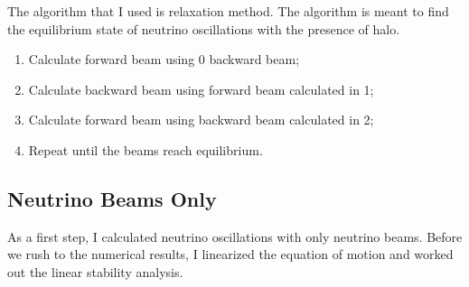 The algorithm that I used is relaxation method. The algorithm is meant to find the equilibrium state of neutrino oscillations with the presence of halo.
\begin{enumerate}
\item Calculate forward beam using 0 backward beam;
\item Calculate backward beam using forward beam calculated in 1;
\item Calculate forward beam using backward beam calculated in 2;
\item Repeat until the beams reach equilibrium.
\end{enumerate}


\subsection{\label{chap:halo-sec:line-sym}Neutrino Beams Only}

As a first step, I calculated neutrino oscillations with only neutrino beams. Before we rush to the numerical results, I linearized the equation of motion and worked out the linear stability analysis.

